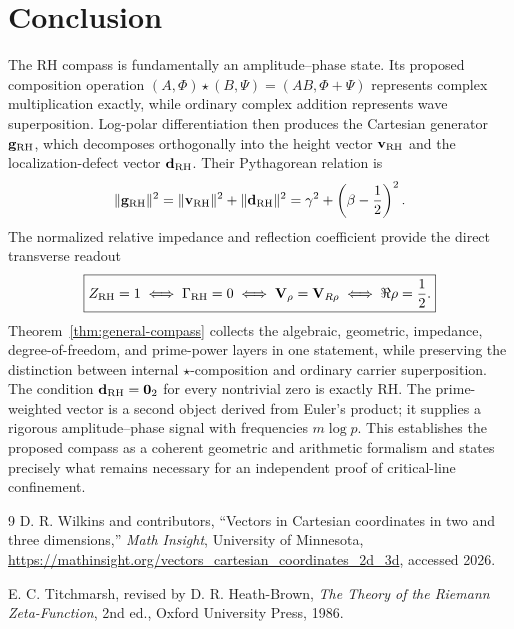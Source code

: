 \documentclass[11pt]{article}
\newcommand{\vzero}{\mathbf 0}
\begin{document}
\section{Conclusion}
The RH compass is fundamentally an amplitude--phase state.  Its proposed composition operation
$(A,\Phi)\star(B,\Psi)=(AB,\Phi+\Psi)$ represents complex multiplication exactly, while
ordinary complex addition represents wave superposition.  Log-polar differentiation then
produces the Cartesian generator $\mathbf g_{\rm RH}$, which decomposes orthogonally into the
height vector $\mathbf v_{\rm RH}$ and the localization-defect vector
$\mathbf d_{\rm RH}$.  Their Pythagorean relation is
\begin{equation}
 \|\mathbf g_{\rm RH}\|^2
 =\|\mathbf v_{\rm RH}\|^2+\|\mathbf d_{\rm RH}\|^2
 =\gamma^2+\left(\beta-\frac12\right)^2.
\end{equation}
The normalized relative impedance and reflection coefficient provide the direct transverse
readout
\begin{equation}
 \boxed{
 Z_{\rm RH}=1
 \iff \Gamma_{\rm RH}=0
 \iff \mathbf V_\rho=\mathbf V_{R\rho}
 \iff \Re\rho=\frac12.}
\end{equation}
Theorem~\ref{thm:general-compass} collects the algebraic, geometric, impedance, degree-of-freedom,
and prime-power layers in one statement, while preserving the distinction between internal
$\star$-composition and ordinary carrier superposition.
The condition $\mathbf d_{\rm RH}=\vzero_2$ for every nontrivial zero is exactly RH.  The
prime-weighted vector is a second object derived from Euler's product; it supplies a rigorous
amplitude--phase signal with frequencies $m\log p$.  This establishes the proposed compass as
a coherent geometric and arithmetic formalism and states precisely what remains necessary for
an independent proof of critical-line confinement.

\begin{thebibliography}{9}
D. R. Wilkins and contributors, ``Vectors in Cartesian coordinates in two and three
dimensions,'' \emph{Math Insight}, University of Minnesota,
\url{https://mathinsight.org/vectors_cartesian_coordinates_2d_3d}, accessed 2026.

E. C. Titchmarsh, revised by D. R. Heath-Brown,
\emph{The Theory of the Riemann Zeta-Function}, 2nd ed., Oxford University Press, 1986.
\end{thebibliography}
\end{document}
